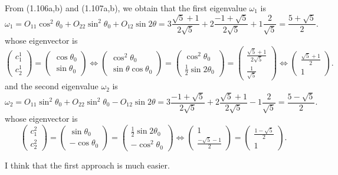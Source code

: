 \documentclass[a4paper]{book}
\newcounter{solution}[chapter]
\begin{document}
\begin{solution}
\begin{itemize}
	From (1.106a,b) and (1.107a,b), we obtain that the first eigenvalue $\omega_1$ is
	\[
		\omega_1 = O_{11} \cos^2 \theta_0 + O_{22} \sin^2 \theta_0 + O_{12} \sin 2\theta = 3 \frac{ \sqrt{5} + 1 }{ 2\sqrt{5} } + 2 \frac{ -1 + \sqrt{5} }{ 2\sqrt{5} } + 1 \frac{ 2 }{ \sqrt{5} } = \frac{ 5 + \sqrt{5} }{2} .
	\]
	whose eigenvector is
	\[
		\begin{pmatrix}
			c^1_1 \\ c^1_2 
		\end{pmatrix} = \begin{pmatrix}
			\cos \theta_0 \\ \sin \theta_0
		\end{pmatrix} \Leftrightarrow \begin{pmatrix}
			\cos^2 \theta_0 \\ \sin \theta \cos \theta_0
		\end{pmatrix} = \begin{pmatrix}
			\cos^2 \theta_0 \\ \frac{1}{2}\sin 2\theta_0
		\end{pmatrix} = \begin{pmatrix}
			\frac{ \sqrt{5} + 1 }{ 2\sqrt{5} } \\ \frac{ 1 }{ \sqrt{5} }
		\end{pmatrix} \Leftrightarrow \begin{pmatrix}
			\frac{ \sqrt{5} + 1 }{ 2 } \\ 1
		\end{pmatrix} .
	\]
	and the second eigenvalue $\omega_2$ is
	\[
		\omega_2 = O_{11} \sin^2 \theta_0 + O_{22} \sin^2 \theta_0 - O_{12} \sin 2\theta = 3 \frac{ -1 + \sqrt{5} }{ 2\sqrt{5} } + 2 \frac{ \sqrt{5} + 1 }{ 2\sqrt{5} } - 1 \frac{ 2 }{ \sqrt{5} } = \frac{ 5 - \sqrt{5} }{ 2 } .
	\]
	whose eigenvector is
	\[
		\begin{pmatrix}
			c^2_1 \\ c^2_2 
		\end{pmatrix} = \begin{pmatrix}
			\sin \theta_0 \\ -\cos \theta_0
		\end{pmatrix} = \begin{pmatrix}
			\frac{1}{2} \sin 2\theta_0 \\ -\cos^2 \theta_0
		\end{pmatrix} \Leftrightarrow  \begin{pmatrix}
			1 \\ \frac{ -\sqrt{5} - 1 }{ 2 }
		\end{pmatrix} = \begin{pmatrix}
			\frac{ 1 - \sqrt{5} }{ 2 } \\ 1 
		\end{pmatrix} .
	\]
	
	\end{itemize}
	
	I think that the first approach is much easier.
	
	\end{solution}	
\end{document}
